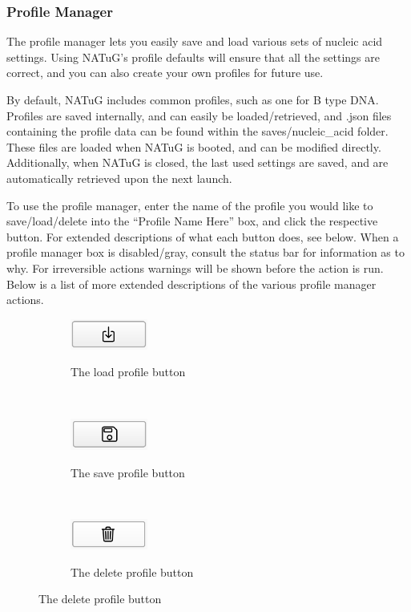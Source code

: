 \documentclass[titlepage]{article}
\begin{document}
	\subsubsection{Profile Manager}
	
	The profile manager lets you easily save and load various sets of nucleic acid settings. Using NATuG’s profile defaults will ensure that all the settings are correct, and you can also create your own profiles for future use.
	
	By default, NATuG includes common profiles, such as one for B type DNA. Profiles are saved internally, and can easily be loaded/retrieved, and .json files containing the profile data can be found within the saves/nucleic\_acid folder. These files are loaded when NATuG is booted, and can be modified directly. Additionally, when NATuG is closed, the last used settings are saved, and are automatically retrieved upon the next launch.
	
	To use the profile manager, enter the name of the profile you would like to save/load/delete into the “Profile Name Here” box, and click the respective button. For extended descriptions of what each button does, see below. When a profile manager box is disabled/gray, consult the status bar for information as to why. For irreversible actions warnings will be shown before the action is run. Below is a list of more extended descriptions of the various profile manager actions.
	
	\begin{figure}
		\caption{Various Profile Actions}
		
		\centering
		\begin{subfigure}{.3\textwidth}
			\centering
			\caption{The load profile button}
			\includegraphics[width=1in]{load-profile-button.png}
			\label{fig:load-profile-button}
		\end{subfigure}%
		~
		\begin{subfigure}{.3\textwidth}
			\centering
			\caption{The save profile button}
			\includegraphics[width=1in]{save-profile-button.png}
			\label{fig:save-profile-button}
		\end{subfigure}%
		~
		\begin{subfigure}{.3\textwidth}
			\centering
			\caption{The delete profile button}
			\includegraphics[width=1in]{delete-profile-button.png}
			\label{fig:delete-profile-button}
		\end{subfigure}
	\end{figure}
	
\end{document}
